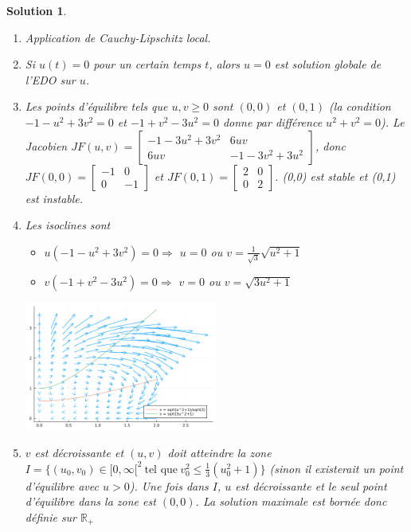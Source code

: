 \documentclass[11pt]{article}
\theoremstyle{exostyle}
\newtheorem{solution}{Solution}
\begin{document}
\begin{solution}
  \begin{enumerate}
  \item Application de Cauchy-Lipschitz local.
  \item Si $u(t)=0$ pour un certain temps $t$, alors $u=0$ est solution globale de l’EDO sur $u$.
  \item Les points d’équilibre tels que $u,v\geq 0$ sont $(0,0)$ et $(0,1)$ (la condition $-1-u^2+3v ^2=0$ et $-1+v^2-3u^2=0$ donne par différence $u^2+v^2=0$).
    Le Jacobien $JF(u,v) = \begin{bmatrix}
      -1-3u^2+3v^2 & 6uv \\
      6uv & -1-3v^2+3u^2
    \end{bmatrix}$, donc $JF(0,0) = \begin{bmatrix}
      -1 & 0 \\ 0 & -1
    \end{bmatrix}$ et $JF(0,1) = \begin{bmatrix}
      2 & 0 \\ 0 & 2
    \end{bmatrix}$. (0,0) est stable et (0,1) est instable.
  \item Les isoclines sont 
    \begin{itemize}
    \item $u (-1-u^2+3v^2) = 0 \Rightarrow$ $u=0$ ou $v = \frac{1}{\sqrt{3}} \sqrt{u^2+1}$
    \item $v (-1+v^2-3u^2) = 0 \Rightarrow$ $v=0$ ou $v =  \sqrt{3u^2+1}$
    \end{itemize}

    \includegraphics[width=0.5\textwidth]{portrait_phase.png}

  \item $v$ est décroissante et $(u,v)$ doit atteindre la zone $I = \Big\lbrace (u_0,v_0) \in [0,\infty[^2 \ \text{tel que} \ v_0^2 \leq \frac{1}{3}(u^2_0+ 1) \Big\rbrace$ (sinon il existerait un point d’équilibre avec $u>0$).
    Une fois dans $I$, $u$ est décroissante et le seul point d’équilibre dans la zone est $(0,0)$. La solution maximale est bornée donc définie sur $\mathbb{R}_+$


\end{enumerate}
\end{solution}
\end{document}
